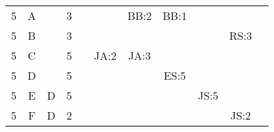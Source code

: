 \documentclass[12pt]{article}
\begin{document}
\begin{table}[H]
\begin{tabular}{@{}c|c|c|c|ccccccc@{}}
5     & A    &            & 3                                                      &                                                 &                                                 & BB:2                                             & BB:1                                             &                                                  &                                                  &                                                  \\
5     & B    &            & 3                                                      &                                                 &                                                 &                                                  &                                                  &                                                  & RS:3                                             &                                                  \\
5     & C    &            & 5                                                      &                                                 & JA:2                                            & JA:3                                             &                                                  &                                                  &                                                  &                                                  \\
5     & D    &            & 5                                                      &                                                 &                                                 &                                                  & ES:5                                             &                                                  &                                                  &                                                  \\ 
5     & E    & D          & 5                                                      &                                                 &                                                 &                                                  &                                                  &  JS:5                                            &                                                  &                                                  \\ 
5     & F    & D          & 2                                                      &                                                 &                                                 &                                                  &                                                  &                                                  & JS:2                                             &                                                  \\ 

\end{tabular}
\end{table}
\end{document}
